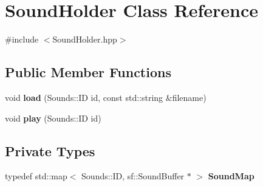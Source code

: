 \hypertarget{classSoundHolder}{\section{\-Sound\-Holder \-Class \-Reference}
\label{classSoundHolder}
}


{\ttfamily \#include $<$\-Sound\-Holder.\-hpp$>$}

\subsection*{\-Public \-Member \-Functions}
\begin{DoxyCompactItemize}
\item 
\hypertarget{classSoundHolder_aff3a6de65bbfc8b9f5437cfc2a54d91e_aff3a6de65bbfc8b9f5437cfc2a54d91e}{void {\bfseries load} (\-Sounds\-::\-I\-D id, const std\-::string \&filename)}\label{classSoundHolder_aff3a6de65bbfc8b9f5437cfc2a54d91e_aff3a6de65bbfc8b9f5437cfc2a54d91e}

\item 
\hypertarget{classSoundHolder_adfa2c1fc9204dd25189ac1b527de773d_adfa2c1fc9204dd25189ac1b527de773d}{void {\bfseries play} (\-Sounds\-::\-I\-D id)}\label{classSoundHolder_adfa2c1fc9204dd25189ac1b527de773d_adfa2c1fc9204dd25189ac1b527de773d}

\end{DoxyCompactItemize}
\subsection*{\-Private \-Types}
\begin{DoxyCompactItemize}
\item 
\hypertarget{classSoundHolder_a7a84cb257412798b69a722e2d17b35da_a7a84cb257412798b69a722e2d17b35da}{typedef std\-::map$<$ \-Sounds\-::\-I\-D, \*
sf\-::\-Sound\-Buffer $\ast$ $>$ {\bfseries \-Sound\-Map}}\label{classSoundHolder_a7a84cb257412798b69a722e2d17b35da_a7a84cb257412798b69a722e2d17b35da}

\end{DoxyCompactItemize}
